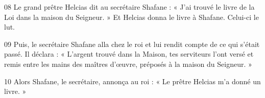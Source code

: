 
08 Le grand prêtre Helcias dit au secrétaire Shafane : « J’ai trouvé le livre de la Loi dans la maison du Seigneur. » Et Helcias donna le livre à Shafane. Celui-ci le lut.

09 Puis, le secrétaire Shafane alla chez le roi et lui rendit compte de ce qui s’était passé. Il déclara : « L’argent trouvé dans la Maison, tes serviteurs l’ont versé et remis entre les mains des maîtres d’œuvre, préposés à la maison du Seigneur. »

10 Alors Shafane, le secrétaire, annonça au roi : « Le prêtre Helcias m’a donné un livre. » 